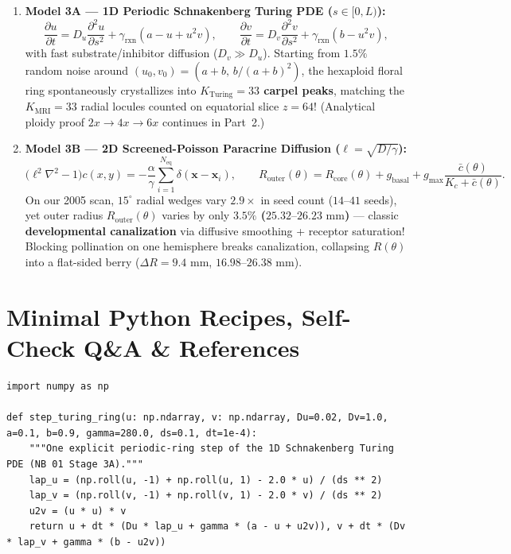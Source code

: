 \documentclass[10.5pt,a4paper]{article}
\begin{document}
\begin{enumerate}
    \item \textbf{Model 3A --- 1D Periodic Schnakenberg Turing PDE ($s \in [0, L)$):}
    \begin{equation}
        \frac{\partial u}{\partial t} = D_u \frac{\partial^2 u}{\partial s^2} + \gamma_{\text{rxn}}\!\left(a - u + u^2 v\right), \qquad \frac{\partial v}{\partial t} = D_v \frac{\partial^2 v}{\partial s^2} + \gamma_{\text{rxn}}\!\left(b - u^2 v\right),
    \end{equation}
    with fast substrate/inhibitor diffusion ($D_v \gg D_u$). Starting from $1.5\%$ random noise around $(u_0, v_0) = (a+b,\, b/(a+b)^2)$, the hexaploid floral ring spontaneously crystallizes into \textbf{$K_{\text{Turing}} = 33$ carpel peaks}, matching the \textbf{$K_{\text{MRI}} = 33$} radial locules counted on equatorial slice $z=64$! (Analytical ploidy proof $2x\to 4x\to 6x$ continues in Part~2.)
    \item \textbf{Model 3B --- 2D Screened-Poisson Paracrine Diffusion ($\ell = \sqrt{D/\gamma}$):}
    \begin{equation}
        \big(\ell^2 \nabla^2 - 1\big) c(x, y) = -\frac{\alpha}{\gamma}\sum_{i=1}^{N_{\text{eq}}} \delta(\mathbf{x} - \mathbf{x}_i), \qquad R_{\text{outer}}(\theta) = R_{\text{core}}(\theta) + g_{\text{basal}} + g_{\max}\frac{\bar{c}(\theta)}{K_c + \bar{c}(\theta)}.
    \end{equation}
    On our 2005 scan, $15^\circ$ radial wedges vary $2.9\times$ in seed count ($14\text{--}41$ seeds), yet outer radius $R_{\text{outer}}(\theta)$ varies by only \textbf{$3.5\%$ ($25.32\text{--}26.23\text{ mm}$)} --- classic \textbf{developmental canalization} via diffusive smoothing + receptor saturation! Blocking pollination on one hemisphere breaks canalization, collapsing $R(\theta)$ into a flat-sided berry ($\Delta R = 9.4\text{ mm}$, $16.98\text{--}26.38\text{ mm}$).
\end{enumerate}

\section{Minimal Python Recipes, Self-Check Q\&A \& References}

\begin{lstlisting}[style=pybmed]
import numpy as np

def step_turing_ring(u: np.ndarray, v: np.ndarray, Du=0.02, Dv=1.0, a=0.1, b=0.9, gamma=280.0, ds=0.1, dt=1e-4):
    """One explicit periodic-ring step of the 1D Schnakenberg Turing PDE (NB 01 Stage 3A)."""
    lap_u = (np.roll(u, -1) + np.roll(u, 1) - 2.0 * u) / (ds ** 2)
    lap_v = (np.roll(v, -1) + np.roll(v, 1) - 2.0 * v) / (ds ** 2)
    u2v = (u * u) * v
    return u + dt * (Du * lap_u + gamma * (a - u + u2v)), v + dt * (Dv * lap_v + gamma * (b - u2v))
\end{lstlisting}
\end{document}

